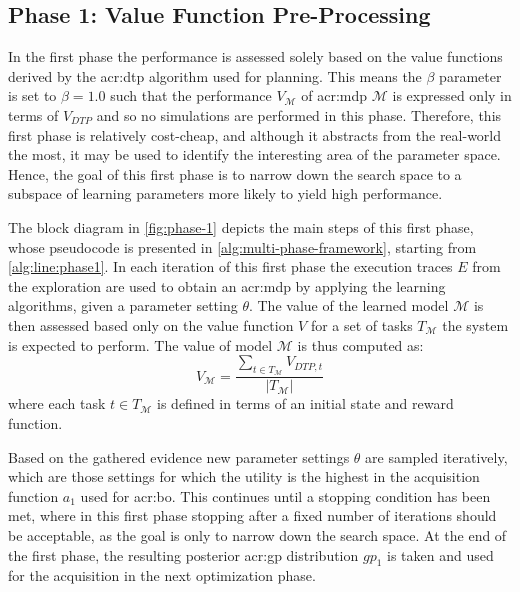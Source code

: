 \subsection{Phase 1: Value Function Pre-Processing}
\label{sec:phase-1}

In the first phase the performance is assessed solely based on the value functions derived by the \acrshort{acr:dtp} algorithm used for planning.
This means the $\beta$ parameter is set to $\beta = 1.0$ such that the performance $V_{\mathcal{M}}$ of \acrshort{acr:mdp} $\mathcal{M}$ is expressed only in terms of $V_\mathit{DTP}$ and so no simulations are performed in this phase.
Therefore, this first phase is relatively cost-cheap, and although it abstracts from the real-world the most, it may be used to identify the interesting area of the parameter space.
Hence, the goal of this first phase is to narrow down the search space to a subspace of learning parameters more likely to yield high performance.

The block diagram in \autoref{fig:phase-1} depicts the main steps of this first phase, whose pseudocode is presented in \autoref{alg:multi-phase-framework}, starting from \autoref{alg:line:phase1}.
In each iteration of this first phase the execution traces $E$ from the exploration are used to obtain an \acrshort{acr:mdp} by applying the learning algorithms, given a parameter setting $\theta$.
The value of the learned model $\mathcal{M}$ is then assessed based only on the value function $V$ for a set of tasks $T_\mathcal{M}$ the system is expected to perform.
The value of model $\mathcal{M}$ is thus computed as:
\begin{equation*} 
V_{\mathcal{M}} = \frac{\sum_{t \in T_\mathcal{M}} V_{\mathit{DTP}, t}}{|T_\mathcal{M}|}
\end{equation*}
where each task $t \in T_\mathcal{M}$ is defined in terms of an initial state and reward function.

Based on the gathered evidence new parameter settings $\theta$ are sampled iteratively, which are those settings for which the utility is the highest in the acquisition function $a_1$ used for \acrshort{acr:bo}.
This continues until a stopping condition has been met, where in this first phase stopping after a fixed number of iterations should be acceptable, as the goal is only to narrow down the search space.
At the end of the first phase, the resulting posterior \acrshort{acr:gp} distribution $\mathit{gp}_1$ is taken and used for the acquisition in the next optimization phase.

